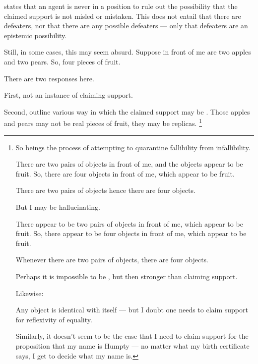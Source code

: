 \begin{note}
  \nfcs{} states that an agent is never in a position to rule out the possibility that the claimed support is not misled or mistaken.
  This does not entail that there are defeaters, nor that there are any possible defeaters --- only that defeaters are an epistemic possibility.

  Still, in some cases, this may seem absurd.
  Suppose in front of me are two apples and two pears.
  So, four pieces of fruit.

  There are two responses here.

  First, not an instance of claiming support.

  Second, outline various way in which the claimed support may be \mom{}.
  Those apples and pears may not be real pieces of fruit, they may be replicas.\nolinebreak
  \footnote{
    So beings the process of attempting to quarantine fallibility from infallibility.

    There are two pairs of objects in front of me, and the objects appear to be fruit.
    So, there are four objects in front of me, which appear to be fruit.

    There are two pairs of objects hence there are four objects.

    But I may be hallucinating.

    There appear to be two pairs of objects in front of me, which appear to be fruit.
    So, there appear to be four objects in front of me, which appear to be fruit.

    Whenever there are two pairs of objects, there are four objects.

    Perhaps it is impossible to be \mom{}, but then stronger than claiming support.

    Likewise:

    Any object is identical with itself --- but I doubt one needs to claim support for reflexivity of equality.

    Similarly, it doesn't seem to be the case that I need to claim support for the proposition that my name is Humpty --- no matter what my birth certificate says, I get to decide what my name is.
  }
\end{note}

